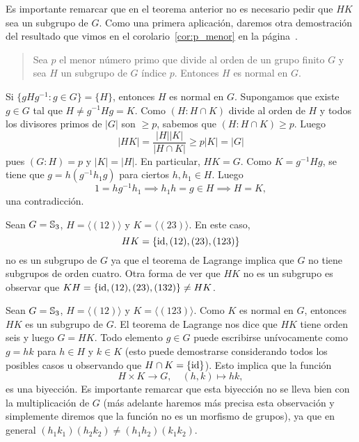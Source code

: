 Es importante remarcar que en el teorema anterior no es necesario pedir que $HK$ sea un subgrupo de $G$. 
Como una primera aplicación, daremos otra demostración del resultado que vimos en el corolario~\ref{cor:p_menor} en la página~\pageref{cor:p_menor}.

\begin{quote}
	Sea $p$ el menor número primo que divide al orden de un grupo finito  
	$G$ y sea $H$ un subgrupo de $G$ índice $p$. Entonces $H$ es normal en $G$. 
\end{quote}

Si $\{gHg^{-1}:g\in G\}=\{H\}$, entonces $H$ es normal en $G$. Supongamos que existe $g\in G$ tal que
$H\ne g^{-1}Hg=K$. Como $(H:H\cap K)$ divide al orden de $H$ y todos los divisores primos de $|G|$ son $\geq p$, sabemos que $(H:H\cap K)\geq p$. Luego
\[
|HK|=\frac{|H||K|}{|H\cap K|}\geq p|K|=|G|
\]
pues $(G:H)=p$ y $|K|=|H|$. En particular, $HK=G$. Como $K=g^{-1}Hg$, se tiene que 
$g=h(g^{-1}h_1g)$ para ciertos $h,h_1\in H$. Luego 
\[
1=hg^{-1}h_1\implies h_1h=g\in H\implies H=K,
\]
una contradicción.


\begin{example}
Sean $G=\mathbb{S}_3$, $H=\langle (12)\rangle$ y $K=\langle (23)\rangle$. En este caso, 
\[
HK=\{\operatorname{id},(12),(23),(123)\}
\]
no es un subgrupo de $G$ ya que el teorema de Lagrange implica que $G$ no 
tiene subgrupos de orden cuatro. Otra forma de ver que $HK$ no es un subgrupo 
es observar que $KH=\{\operatorname{id},(12),(23),(132)\}\ne HK$. 
\end{example}

\begin{example}
Sean $G=\mathbb{S}_3$, $H=\langle (12)\rangle$ y $K=\langle (123)\rangle$. 
Como $K$ es normal en $G$, entonces $HK$ es un subgrupo de $G$. El teorema
de Lagrange nos dice que $HK$ tiene orden seis y luego $G=HK$. 
Todo elemento $g\in G$ puede escribirse unívocamente como $g=hk$ para $h\in H$ y $k\in K$ (esto puede
demostrarse considerando todos los posibles casos u 
observando que $H\cap K=\{\operatorname{id}\}$). Esto implica que la función
\[
H\times K\to G,\quad 
(h,k)\mapsto hk,
\]
es una biyección. Es importante remarcar que esta biyección no se lleva bien 
con la multiplicación de $G$ (más adelante haremos más precisa esta observación y 
simplemente diremos que la función no es un morfismo de grupos), 
ya que en general $(h_1k_1)(h_2k_2)\ne (h_1h_2)(k_1k_2)$. 
\end{example}
